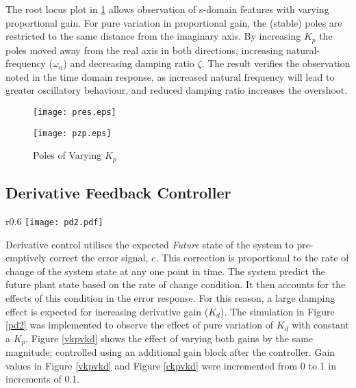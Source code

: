 The root locus plot in \ref{pzp} allows observation of s-domain features
with varying proportional gain. For pure variation in proportional gain,
the (stable) poles are restricted to the same distance from the
imaginary axis. By increasing \(K_p\) the poles moved away from the real
axis in both directions, increasing natural-frequency (\(\omega_n\)) and
decreasing damping ratio \(\zeta\). The result verifies the observation
noted in the time domain response, as increased natural frequency will
lead to greater oscillatory behaviour, and reduced damping ratio
increases the overshoot.

\begin{figure}[H]
\centering
\begin{minipage}{.455\textwidth}
 \centering
 \texttt{[image: pres.eps]}
 \caption{Response of Varying $K_p$}
 \label{pres}
\end{minipage}
\hfill
\begin{minipage}{.5\textwidth}
\centering
\texttt{[image: pzp.eps]}
\caption{Poles of Varying $K_p$}
\label{pzp}
\end{minipage}
\vspace{-20pt}
\end{figure}

\subsection{Derivative Feedback
Controller}\label{derivative-feedback-controller}

\begin{wrapfigure}{r}{0.6\textwidth}
\centering
\vspace{-35pt} %
\texttt{[image: pd2.pdf]}
\vspace{-10pt}
\caption{PD Feedback Controller}
\label{pd2}
\vspace{-20pt}
\end{wrapfigure}

Derivative control utilises the expected \emph{Future} state of the
system to pre-emptively correct the error signal, \(e\). This correction
is proportional to the rate of change of the system state at any one
point in time. The system predict the future plant state based on the
rate of change condition. It then accounts for the effects of this
condition in the error response. For this reason, a large damping effect
is expected for increasing derivative gain (\(K_d\)). The simulation in
Figure \ref{pd2} was implemented to observe the effect of pure variation
of \(K_d\) with constant a \(K_p\). Figure \ref{vkpvkd} shows the effect
of varying both gains by the same magnitude; controlled using an
additional gain block after the controller. Gain values in Figure
\ref{vkpvkd} and Figure \ref{ckpvkd} were incremented from 0 to 1 in
increments of 0.1.

